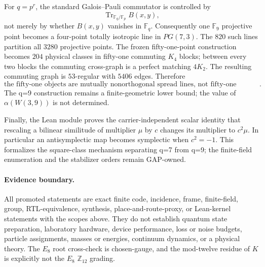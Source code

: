 For $q=p^r$, the standard Galois--Pauli commutator is controlled by
\[
 \operatorname{Tr}_{\mathbb F_q/\mathbb F_p}B(x,y),
\]
not merely by whether $B(x,y)$ vanishes in $\mathbb F_q$.  Consequently one
$\mathbb F_9$ projective point becomes a four-point totally isotropic line in
$PG(7,3)$.  The $820$ such lines partition all $3280$ projective points.  The
frozen fifty-one-point construction becomes $204$ physical classes in
fifty-one commuting $K_4$ blocks; between every two blocks the commuting
cross-graph is a perfect matching $4K_2$.  The resulting commuting graph is
$53$-regular with $5406$ edges.  Therefore
\[
 \boxed{\text{the fifty-one objects are mutually nonorthogonal spread lines,
 not fifty-one pairwise-noncommuting physical Pauli classes}.}
\]
The q=9 construction remains a finite-geometric lower bound; the value of
$\alpha(W(3,9))$ is not determined.

Finally, the Lean module
 proves the
carrier-independent scalar identity that rescaling a bilinear similitude of
multiplier $\mu$ by $c$ changes its multiplier to $c^2\mu$.  In particular an
antisymplectic map becomes symplectic when $c^2=-1$.  This formalizes the
square-class mechanism separating q=7 from q=9; the finite-field enumeration
and the stabilizer orders remain GAP-owned.

\paragraph{Evidence boundary.}
All promoted statements are exact finite code, incidence, frame, finite-field,
group, RTL-equivalence, synthesis, place-and-route-proxy, or Lean-kernel
statements with the scopes above.  They do not establish quantum state
preparation, laboratory hardware, device performance, loss or noise budgets,
particle assignments, masses or energies, continuum dynamics, or a physical
theory.  The $E_8$ root cross-check is chosen-gauge, and the mod-twelve
residue of $K$ is explicitly not the $E_8$ $\mathbb Z_{12}$ grading.
